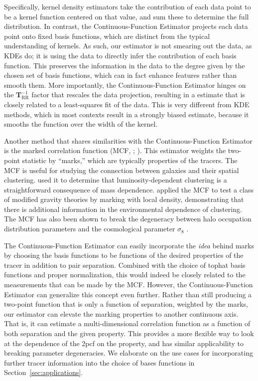 \documentclass[modern]{aastex62}
\newcommand{\cf}{2pcf\xspace}
\newcommand{\Est}{The Continuous-Function Estimator\xspace}
\newcommand{\est}{the Continuous-Function Estimator\xspace}
\newcommand{\inv}{^{-1}}
\newcommand{\bld}[1]{\bm{#1}}
\newcommand{\TT}[1]{\bld{T}_\mathrm{#1}}
\begin{document}
Specifically, kernel density estimators take the contribution of each data point to be a kernel function centered on that value, and sum these to determine the full distribution.
In contrast, \est projects each data point onto fixed basis functions, which are distinct from the typical understanding of kernels.
As such, our estimator is not smearing out the data, as KDEs do; it is using the data to directly infer the contribution of each basis function.
This preserves the information in the data to the degree given by the chosen set of basis functions, which can in fact enhance features rather than smooth them.
More importantly, \est hinges on the $\TT{RR}\inv$ factor that rescales the data projection, resulting in a estimate that is closely related to a least-squares fit of the data.
This is very different from KDE methods, which in most contexts result in a strongly biased estimate, because it smooths the function over the width of the kernel.

Another method that shares similarities with \est is the marked correlation function (MCF, \citealt{Beisbart2000}; \citealt{Sheth2005}).
This estimator weights the two-point statistic by ``marks,'' which are typically properties of the tracers.
The MCF is useful for studying the connection between galaxies and their spatial clustering.
\cite{Skibba2006} used it to determine that luminosity-dependent clustering is a straightforward consequence of mass dependence.
\cite{Armijo2018} applied the MCF to test a class of modified gravity theories by marking with local density, demonstrating that there is additional information in the environmental dependence of clustering.
The MCF has also been shown to break the degeneracy between halo occupation distribution parameters and the cosmological parameter $\sigma_8$ \citep{WhitePadmanabhan2009}.

\Est can easily incorporate the \textit{idea} behind marks by choosing the basis functions to be functions of the desired properties of the tracer in addition to pair separation.
Combined with the choice of tophat basis functions and proper normalization, this would indeed be closely related to the measurements that can be made by the MCF.
However, \est can generalize this concept even further. 
Rather than still producing a two-point function that is only a function of separation, weighted by the marks, our estimator can elevate the marking properties to another continuous axis.
That is, it can estimate a multi-dimensional correlation function as a function of both separation and the given property.
This provides a more flexible way to look at the dependence of the \cf on the property, and has similar applicability to breaking parameter degeneracies.
We elaborate on the use cases for incorporating further tracer information into the choice of bases functions in Section~\ref{sec:applications}.
\end{document}
